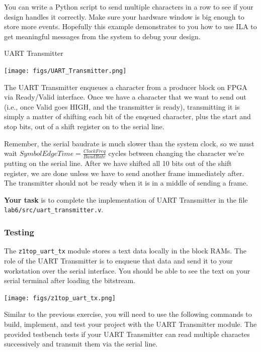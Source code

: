 \documentclass[11pt]{article}
\makeatletter
\renewcommand{\subsection}
{\@startsection {subsection}{1}{0pt}
 {-1ex}
 {0.5ex}
 {\bfseries\normalsize}}
\makeatother
\begin{document}
You can write a Python script to send multiple characters in a row to see if your design handles it correctly. Make sure your hardware window is big enough to store more events. Hopefully this example demonstrates to you how to use ILA to get meaningful messages from the system to debug your design.

\subsection{UART Transmitter}

\begin{center}
\texttt{[image: figs/UART\_Transmitter.png]}
\end{center}

The UART Transmitter enqueues a character from a producer block on FPGA via Ready/Valid interface. Once we have a character that we want to send out (i.e., once Valid goes HIGH, and the transmitter is ready), transmitting it is simply a matter of shifting each bit of the enqeued character, plus the start and stop bits, out of a shift register on to the serial line.

Remember, the serial baudrate is much slower than the system clock, so we must wait $SymbolEdgeTime = \frac{ClockFreq}{BaudRate}$ cycles between changing the character we're putting on the serial line.
After we have shifted all 10 bits out of the shift register, we are done unless we have to send another frame immediately after. The transmitter should not be ready when it is in a middle of sending a frame.

\textbf{Your task} is to complete the implementation of UART Transmitter in the file \verb|lab6/src/uart_transmitter.v|.

\subsubsection{Testing}

The \verb|z1top_uart_tx| module stores a text data locally in the block RAMs. The role of the UART Transmitter is to enqueue that data and send it to your workstation over the serial interface. You should be able to see the text on your serial terminal after loading the bitstream.

\begin{center}
\texttt{[image: figs/z1top\_uart\_tx.png]}
\end{center}

Similar to the previous exercise, you will need to use the following commands to build, implement, and test your project with the UART Transmitter module. The provided testbench tests if your UART Transmitter can read multiple charactes successively and transmit them via the serial line.
\end{document}
